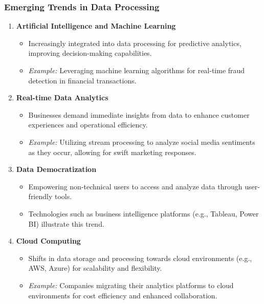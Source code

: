 \documentclass[aspectratio=169]{beamer}
\begin{document}
\begin{frame}[fragile]
    \frametitle{Emerging Trends in Data Processing}
    \begin{enumerate}
        \item \textbf{Artificial Intelligence and Machine Learning}
            \begin{itemize}
                \item Increasingly integrated into data processing for predictive analytics, improving decision-making capabilities.
                \item \textit{Example:} Leveraging machine learning algorithms for real-time fraud detection in financial transactions.
            \end{itemize}
        \item \textbf{Real-time Data Analytics}
            \begin{itemize}
                \item Businesses demand immediate insights from data to enhance customer experiences and operational efficiency.
                \item \textit{Example:} Utilizing stream processing to analyze social media sentiments as they occur, allowing for swift marketing responses.
            \end{itemize}
        \item \textbf{Data Democratization}
            \begin{itemize}
                \item Empowering non-technical users to access and analyze data through user-friendly tools.
                \item Technologies such as business intelligence platforms (e.g., Tableau, Power BI) illustrate this trend.
            \end{itemize}
        \item \textbf{Cloud Computing}
            \begin{itemize}
                \item Shifts in data storage and processing towards cloud environments (e.g., AWS, Azure) for scalability and flexibility.
                \item \textit{Example:} Companies migrating their analytics platforms to cloud environments for cost efficiency and enhanced collaboration.
            \end{itemize}
    \end{enumerate}
\end{frame}
\end{document}
